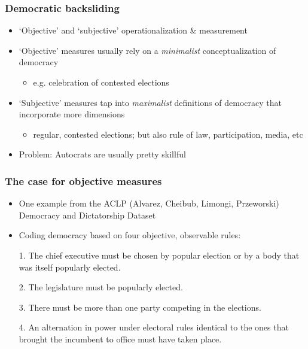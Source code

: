 \documentclass[aspectratio=43]{beamer}
\begin{document}

\begin{frame}
\frametitle{Democratic backsliding}
\centering

\begin{itemize}
  \item `Objective' and `subjective' operationalization \& measurement
  \item `Objective' measures usually rely on a \textit{minimalist} conceptualization of democracy
  \begin{itemize}
    \item e.g. celebration of contested elections
  \end{itemize}
  \item `Subjective' measures tap into \textit{maximalist} definitions of democracy that incorporate more dimensions
  \begin{itemize}
    \item regular, contested elections; but also rule of law, participation, media, etc
  \end{itemize}
  \item Problem: Autocrats are usually pretty skillful
\end{itemize}

\end{frame}

\begin{frame}
\frametitle{The case for objective measures}
\centering

\begin{itemize}
  \item One example from the ACLP (Alvarez, Cheibub, Limongi, Przeworski) Democracy and Dictatorship Dataset
  \item Coding democracy based on four objective, observable rules:
  \item[1.] {\small The chief executive must be chosen by popular election or by a body that was itself popularly elected.}
  \item[2.] {\small The legislature must be popularly elected.}
  \item[3.] {\small There must be more than one party competing in the elections.}
  \item[4.] {\small An alternation in power under electoral rules identical to the ones that brought the incumbent to office must have taken place.}
\end{itemize}

\end{frame}
\end{document}
